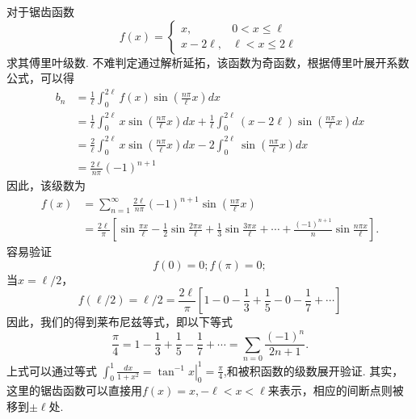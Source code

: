 \begin{examplebox}{
对于锯齿函数
\[  
f(x)= \begin{cases}
  x,   &  0 < x \leq  \ell 
  \\
  x - 2 \ell,   & \ell < x \leq 2\ell
\end{cases}
\]
求其傅里叶级数.
}
不难判定通过解析延拓，该函数为奇函数，根据傅里叶展开系数公式，可以得
\begin{align}
b_n &=   \frac{1}{\ell} \int_{0}^{2\ell} f(x) \sin {  \left( \frac{n\pi}{\ell} x \right) } dx \nonumber
\\
&= \frac{1}{\ell} \int_{0}^{2\ell} x  \sin {  \left( \frac{n\pi}{\ell} x \right) } dx \nonumber
  +
 \frac{1}{\ell} \int_{0}^{2\ell} (x - 2\ell) \sin {  \left( \frac{n\pi}{\ell} x \right) } dx \nonumber
 \\ 
 &= \frac{2}{\ell} \int_{0}^{2\ell} x \sin {  \left( \frac{n\pi}{\ell} x \right) } dx \nonumber
 -2 \int_{0}^{2\ell}   \sin {  \left( \frac{n\pi}{\ell} x \right) } dx \nonumber
 \\
 & = \frac{2\ell}{n\pi} (-1)^{n+1}  \nonumber
\end{align}
因此，该级数为
\begin{align}
f(x) &=  \sum_{n=1}^{\infty} \frac{2 \ell }{n\pi} (-1)^{n+1} \sin {  \left( \frac{n\pi}{\ell} x \right) }  \nonumber
\\
 & =\frac{2\ell}{\pi} \left[ \sin{\frac{\pi x}{\ell} } - \frac{1}{2}\sin{\frac{2\pi x}{\ell} } 
  +  \frac{1}{3}\sin{\frac{3\pi x}{\ell} } + \cdots + \frac{(-1)^{n+1}}{n}\sin{\frac{n\pi x}{\ell} }
 \right] \nonumber
.
\end{align}
容易验证
\[
  f(0) = 0; f(\pi) = 0;
\]
当$x=\ell/2$， 
\[
f(\ell/2) = \ell/2 =   \frac{2\ell}{\pi} \left[ 1 - 0 - \frac{1}{3} + \frac{1}{5} - 0 -\frac{1}{7}+ \cdots \right]
\]
因此，我们的得到莱布尼兹等式，即以下等式
\[
\frac{\pi}{4} = 1-\frac{1}{3} + \frac{1}{5} - \frac{1}{7} + \cdots = \sum_{n=0} \frac{(-1)^n}{2n + 1} .
\]
上式可以通过等式
$\int_0^1 \frac{d x}{1+x^2}=\left.\tan ^{-1} x\right|_0 ^1=\frac{\pi}{4}$,和被积函数的级数展开验证.
其实，这里的锯齿函数可以直接用$f(x) = x, -\ell < x < \ell$来表示，相应的间断点则被移到$\pm \ell$处.
\end{examplebox}



